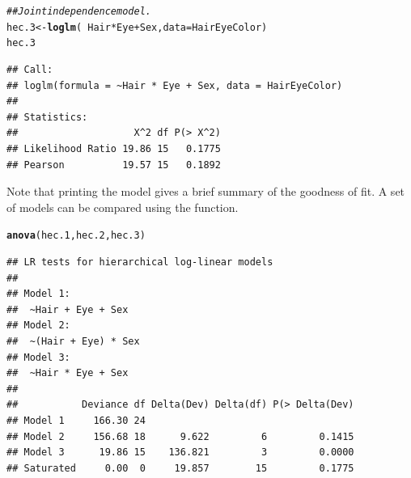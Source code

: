 \documentclass[10pt,twoside]{article}\usepackage[]{graphicx}\usepackage[]{color}
\makeatletter
\newcommand{\hlcom}[1]{\textcolor[rgb]{0.678,0.584,0.686}{\textit{#1}}}%
\newcommand{\hlopt}[1]{\textcolor[rgb]{0,0,0}{#1}}%
\newcommand{\hlstd}[1]{\textcolor[rgb]{0.345,0.345,0.345}{#1}}%
\newcommand{\hlkwb}[1]{\textcolor[rgb]{0.69,0.353,0.396}{#1}}%
\newcommand{\hlkwc}[1]{\textcolor[rgb]{0.333,0.667,0.333}{#1}}%
\newcommand{\hlkwd}[1]{\textcolor[rgb]{0.737,0.353,0.396}{\textbf{#1}}}%
\newenvironment{kframe}{%
 \def\at@end@of@kframe{}%
 \ifinner\ifhmode%
  \def\at@end@of@kframe{\end{minipage}}%
  \begin{minipage}{\columnwidth}%
 \fi\fi%
 \def\FrameCommand##1{\hskip\@totalleftmargin \hskip-\fboxsep
 \colorbox{shadecolor}{##1}\hskip-\fboxsep
     \hskip-\linewidth \hskip-\@totalleftmargin \hskip\columnwidth}%
 \MakeFramed {\advance\hsize-\width
   \@totalleftmargin\z@ \linewidth\hsize
   \@setminipage}}%
 {\par\unskip\endMakeFramed%
 \at@end@of@kframe}
\newenvironment{knitrout}{}{} %
\newcommand{\codefun}[1]{\code{#1()}}
\makeatother
\begin{document}
\begin{knitrout}
\color{fgcolor}\begin{kframe}
\begin{alltt}
\hlcom{## Joint independence model.  }
\hlstd{hec.3} \hlkwb{<-} \hlkwd{loglm}\hlstd{(}\hlopt{~}\hlstd{Hair}\hlopt{*}\hlstd{Eye} \hlopt{+} \hlstd{Sex,} \hlkwc{data}\hlstd{=HairEyeColor)}
\hlstd{hec.3}
\end{alltt}
\begin{verbatim}
## Call:
## loglm(formula = ~Hair * Eye + Sex, data = HairEyeColor)
## 
## Statistics:
##                    X^2 df P(> X^2)
## Likelihood Ratio 19.86 15   0.1775
## Pearson          19.57 15   0.1892
\end{verbatim}
\end{kframe}
\end{knitrout}

Note that printing the model gives a brief summary of the goodness of fit.
A set of models can be compared using the \codefun{anova} function.

\begin{knitrout}
\color{fgcolor}\begin{kframe}
\begin{alltt}
\hlkwd{anova}\hlstd{(hec.1, hec.2, hec.3)}
\end{alltt}
\begin{verbatim}
## LR tests for hierarchical log-linear models
## 
## Model 1:
##  ~Hair + Eye + Sex 
## Model 2:
##  ~(Hair + Eye) * Sex 
## Model 3:
##  ~Hair * Eye + Sex 
## 
##           Deviance df Delta(Dev) Delta(df) P(> Delta(Dev)
## Model 1     166.30 24                                    
## Model 2     156.68 18      9.622         6         0.1415
## Model 3      19.86 15    136.821         3         0.0000
## Saturated     0.00  0     19.857        15         0.1775
\end{verbatim}
\end{kframe}
\end{knitrout}
\end{document}
